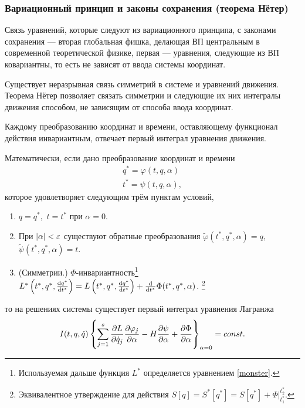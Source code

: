 \subsubsection{Вариационный принцип и законы сохранения (теорема Нётер)} 
Связь уравнений, которые следуют из вариационного принципа, с законами сохранения --- вторая глобальная фишка, делающая ВП центральным в современной теоретической физике, первая --- уравнения, следующие из ВП ковариантны, то есть не зависят от ввода системы координат. 

Существует неразрывная связь симметрий в системе и уравнений движения. Теорема Нётер позволяет связать симметрии и следующие их них интегралы движения способом, не зависящим от способа ввода координат.

\begin{thm}
Каждому преобразованию координат и времени, оставляющему функционал действия инвариантным, отвечает первый интеграл уравнения движения.

Математически, если дано преобразование координат и времени
\begin{gather}
q^* = \varphi(t, q, \alpha)\\
t^* = \psi (t, q, \alpha),
\end{gather}
которое удовлетворяет следующим трём пунктам  условий,
\begin{enumerate}
\item $q = q^*,$ $t = t^*$ при $\alpha = 0.$

\item При $\abs{\alpha} < \varepsilon$ существуют обратные преобразования $\tilde{\varphi}(t^*, q^*, \alpha) = q,$ $\widetilde{\psi}(t^*, q^*, \alpha) = t.$

\item  (Симметрии.) $\Phi$-инвариантность\footnote{Используемая дальше функция $L^*$ определяется уравнением \eqref{monster}.} $L^* \left(t^*, q^*, \dv{q^*}{t^*}\right) = L \left(t^*, q^*, \dv{q^*}{t^*}\right) + \dv{t^*} \Phi(t^*, q^*, \alpha)$. \footnote{Эквивалентное утверждение для действия $S[q] = S^*[q^*] = S[q^*] + \left.\Phi \right|_{t_1^*}^{t_2^*}$.}
\end{enumerate}

то на решениях системы существует первый интеграл уравнения Лагранжа
\[I(t, q, \dot{q}) \left\{ \sum_{j=1}^s \pdv{L}{\dot{q}_j} \pdv{\varphi_j}{\alpha} - H \pdv{\psi}{\alpha} + \pdv{\Phi}{\alpha} \right\}_{\alpha = 0} = const.\]
\end{thm}

